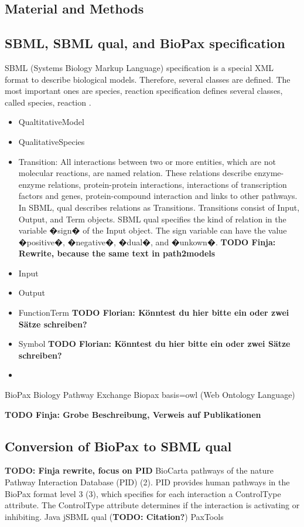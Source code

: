 \documentclass{bioinfo}
\begin{document}
\begin{methods}
\section{Material and Methods}
\subsection{SBML, SBML qual, and BioPax specification}
SBML (Systems Biology Markup Language) specification is a special XML format to describe biological models. Therefore, several classes are defined. The most important ones are species, reaction  specification defines several classes, called species, reaction \citep{Hucka2003}.
\begin{itemize}
\item QualtitativeModel
\item QualitativeSpecies
\item Transition: All interactions between two or more entities, which are not molecular reactions, are named relation. These relations describe enzyme-enzyme relations, protein-protein interactions, interactions of transcription factors and genes, protein-compound interaction and links to other pathways. In SBML, qual describes relations as Transitions. Transitions consist of Input, Output, and Term objects. SBML qual specifies the kind of relation in the variable �sign� of the Input object. The sign variable can have the value �positive�, �negative�, �dual�, and �unkown�. \textbf{TODO Finja: Rewrite, because the same text in path2models}
\item Input
\item Output
\item FunctionTerm \textbf{TODO Florian: K\"onntest du hier bitte ein oder zwei S\"atze schreiben?}
\item Symbol     \textbf{TODO Florian: K\"onntest du hier bitte ein oder zwei S\"atze schreiben?}
\item
\end{itemize}

BioPax Biology Pathway Exchange \citep{Demir2010}
Biopax basis=owl (Web Ontology Language)


\textbf{TODO Finja: Grobe Beschreibung, Verweis auf Publikationen}

\subsection{Conversion of BioPax to SBML qual}
\textbf{TODO: Finja rewrite, focus on PID}
 BioCarta pathways of the nature Pathway Interaction Database (PID) (2). PID provides human pathways in the BioPax format level 3 (3), which specifies for each interaction a ControlType attribute. The ControlType attribute determines if the interaction is activating or inhibiting.
Java
jSBML \citep{Draeger2011}
qual (\textbf{TODO: Citation?})
PaxTools



\end{methods}
\end{document}
